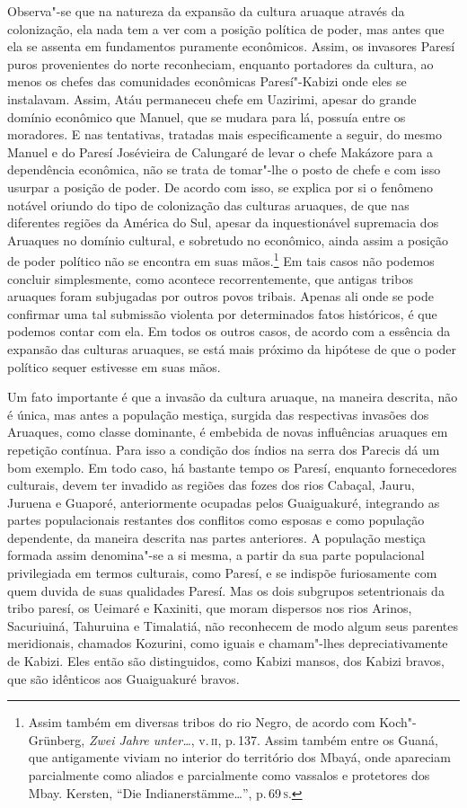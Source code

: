 Observa"-se que na natureza da expansão da cultura aruaque através da
colonização, ela nada tem a ver com a posição política de poder, mas
antes que ela se assenta em fundamentos puramente econômicos. Assim, os
invasores Paresí puros provenientes do norte reconheciam, enquanto
portadores da cultura, ao menos os chefes das comunidades econômicas
Paresí"-Kabizi onde eles se instalavam. Assim, Atáu permaneceu chefe em
Uazirimi, apesar do grande domínio econômico que Manuel, que se mudara
para lá, possuía entre os moradores. E nas tentativas, tratadas mais
especificamente a seguir, do mesmo Manuel e do Paresí Josévieira de
Calungaré de levar o chefe Makázore para a dependência econômica, não se
trata de tomar"-lhe o posto de chefe e com isso usurpar a posição de
poder. De acordo com isso, se explica por si o fenômeno notável oriundo
do tipo de colonização das culturas aruaques, de que nas diferentes
regiões da América do Sul, apesar da inquestionável supremacia dos
Aruaques no domínio cultural, e sobretudo no econômico, ainda assim a
posição de poder político não se encontra em suas mãos.\footnote{Assim
  também em diversas tribos do rio Negro, de acordo com Koch"-Grünberg,
  \textit{Zwei Jahre unter\ldots}, v.\,\textsc{ii}, p.\,137. Assim também
  entre os Guaná, que antigamente viviam no interior do território dos
  Mbayá, onde apareciam parcialmente como aliados e parcialmente como
  vassalos e protetores dos Mbay. Kersten, ``Die Indianerstämme\ldots'', p.\,69\,\textsc{s}.} Em
tais casos não podemos concluir simplesmente, como acontece
recorrentemente, que antigas tribos aruaques foram subjugadas por outros
povos tribais. Apenas ali onde se pode confirmar uma tal submissão
violenta por determinados fatos históricos, é que podemos contar com
ela. Em todos os outros casos, de acordo com a essência da expansão das
culturas aruaques, se está mais próximo da hipótese de que o poder
político sequer estivesse em suas mãos.

Um fato importante é que a invasão da cultura aruaque, na maneira
descrita, não é única, mas antes a população mestiça, surgida das
respectivas invasões dos Aruaques, como classe dominante, é embebida de
novas influências aruaques em repetição contínua. Para isso a condição
dos índios na serra dos Parecis dá um bom exemplo. Em todo caso, há
bastante tempo os Paresí, enquanto fornecedores culturais, devem ter
invadido as regiões das fozes dos rios Cabaçal, Jauru, Juruena e
Guaporé, anteriormente ocupadas pelos Guaiguakuré, integrando as partes
populacionais restantes dos conflitos como esposas e como população
dependente, da maneira descrita nas partes anteriores. A população
mestiça formada assim denomina"-se a si mesma, a partir da sua parte
populacional privilegiada em termos culturais, como Paresí, e se
indispõe furiosamente com quem duvida de suas qualidades Paresí. Mas os
dois subgrupos setentrionais da tribo paresí, os Ueimaré e Kaxiniti, que
moram dispersos nos rios Arinos, Sacuriuiná, Tahuruina e Timalatiá, não
reconhecem de modo algum seus parentes meridionais, chamados Kozurini,
como iguais e chamam"-lhes depreciativamente de Kabizi. Eles então são
distinguidos, como Kabizi mansos, dos Kabizi bravos, que são idênticos
aos Guaiguakuré bravos.

